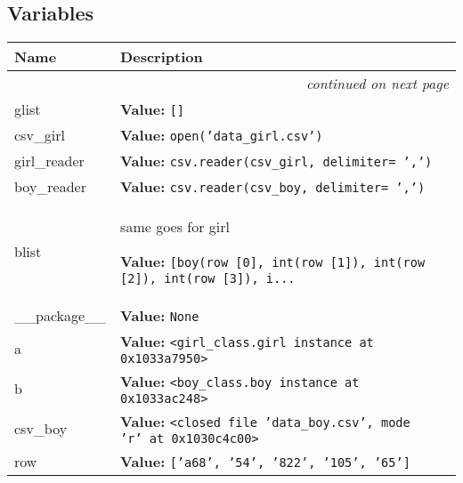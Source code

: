   \subsection{Variables}

    \vspace{-1cm}
\hspace{\varindent}\begin{longtable}{|p{\varnamewidth}|p{\vardescrwidth}|l}
\cline{1-2}
\cline{1-2} \centering \textbf{Name} & \centering \textbf{Description}& \\
\cline{1-2}
\endhead\cline{1-2}\multicolumn{3}{r}{\small\textit{continued on next page}}\\\endfoot\cline{1-2}
\endlastfoot\raggedright g\-l\-i\-s\-t\- & \raggedright \textbf{Value:} 
{\tt []}&\\
\cline{1-2}
\raggedright c\-s\-v\-\_\-g\-i\-r\-l\- & \raggedright \textbf{Value:} 
{\tt open('data\_girl.csv')}&\\
\cline{1-2}
\raggedright g\-i\-r\-l\-\_\-r\-e\-a\-d\-e\-r\- & \raggedright \textbf{Value:} 
{\tt csv.reader(csv\_girl, delimiter= ',')}&\\
\cline{1-2}
\raggedright b\-o\-y\-\_\-r\-e\-a\-d\-e\-r\- & \raggedright \textbf{Value:} 
{\tt csv.reader(csv\_boy, delimiter= ',')}&\\
\cline{1-2}
\raggedright b\-l\-i\-s\-t\- & \raggedright same goes for girl

\textbf{Value:} 
{\tt [boy(row [0], int(row [1]), int(row [2]), int(row [3]), i\texttt{...}}&\\
\cline{1-2}
\raggedright \_\-\_\-p\-a\-c\-k\-a\-g\-e\-\_\-\_\- & \raggedright \textbf{Value:} 
{\tt None}&\\
\cline{1-2}
\raggedright a\- & \raggedright \textbf{Value:} 
{\tt {\textless}girl\_class.girl instance at 0x1033a7950{\textgreater}}&\\
\cline{1-2}
\raggedright b\- & \raggedright \textbf{Value:} 
{\tt {\textless}boy\_class.boy instance at 0x1033ac248{\textgreater}}&\\
\cline{1-2}
\raggedright c\-s\-v\-\_\-b\-o\-y\- & \raggedright \textbf{Value:} 
{\tt {\textless}closed file 'data\_boy.csv', mode 'r' at 0x1030c4c00{\textgreater}}&\\
\cline{1-2}
\raggedright r\-o\-w\- & \raggedright \textbf{Value:} 
{\tt \texttt{[}\texttt{'}\texttt{a68}\texttt{'}\texttt{, }\texttt{'}\texttt{54}\texttt{'}\texttt{, }\texttt{'}\texttt{822}\texttt{'}\texttt{, }\texttt{'}\texttt{105}\texttt{'}\texttt{, }\texttt{'}\texttt{65}\texttt{'}\texttt{]}}&\\
\cline{1-2}
\end{longtable}

